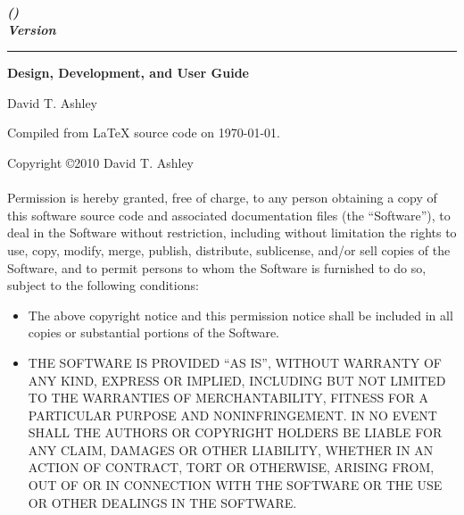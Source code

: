 
\thispagestyle{empty}

\begin{flushright}
\vspace*{0mm}
\Huge\bfseries
\emph{\productbasenamelong{} (\productbasenameshort{})}\\
\emph{Version \productversion{}}\\
\end{flushright}
\vspace{0.0cm}
\noindent\rule{\textwidth}{2pt}
\begin{flushright}
\huge\bfseries
Design, Development, and User Guide
\end{flushright}
\vfill
\begin{flushright}
\begin{small}
David T. Ashley
\end{small}
\end{flushright}
\vspace{0.2cm}
\begin{flushright}
\begin{small}
Compiled from \LaTeX{} source code on \today .  
\end{small}
\end{flushright}

\pagebreak
\thispagestyle{empty}
\begin{small}
\noindent{}Copyright \copyright 2010 David T. Ashley\\\\
\noindent{}Permission is hereby granted, free of charge, to any person obtaining a copy
of this software source code and associated documentation files (the
``Software''), to deal in the Software without restriction, including without
limitation the rights to use, copy, modify, merge, publish, distribute,
sublicense, and/or sell copies of the Software, and to permit persons to whom
the Software is furnished to do so, subject to the following conditions:

\begin{itemize}
\item The above copyright notice and this permission notice shall be included in
      all copies or substantial portions of the Software.
\item THE SOFTWARE IS PROVIDED ``AS IS'', WITHOUT WARRANTY OF ANY KIND, EXPRESS OR
      IMPLIED, INCLUDING BUT NOT LIMITED TO THE WARRANTIES OF MERCHANTABILITY,
      FITNESS FOR A PARTICULAR PURPOSE AND NONINFRINGEMENT\@. IN NO EVENT SHALL THE
      AUTHORS OR COPYRIGHT HOLDERS BE LIABLE FOR ANY CLAIM, DAMAGES OR OTHER
      LIABILITY, WHETHER IN AN ACTION OF CONTRACT, TORT OR OTHERWISE, ARISING FROM,
      OUT OF OR IN CONNECTION WITH THE SOFTWARE OR THE USE OR OTHER DEALINGS IN
      THE SOFTWARE.
\end{itemize}
\end{small}

